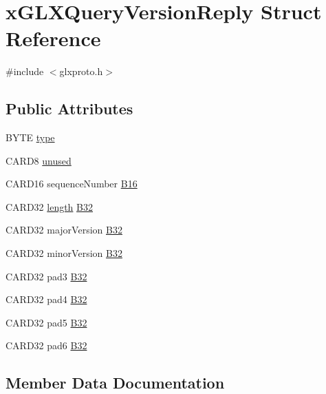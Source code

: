 \hypertarget{structx_g_l_x_query_version_reply}{}\section{x\+G\+L\+X\+Query\+Version\+Reply Struct Reference}
\label{structx_g_l_x_query_version_reply}


{\ttfamily \#include $<$glxproto.\+h$>$}

\subsection*{Public Attributes}
\begin{DoxyCompactItemize}
\item 
B\+Y\+TE \hyperlink{structx_g_l_x_query_version_reply_ae3ead0f46874a7a0d2632157b418acbb}{type}
\item 
C\+A\+R\+D8 \hyperlink{structx_g_l_x_query_version_reply_aec85cfd7fd03acfb9bdf8f8741904b13}{unused}
\item 
C\+A\+R\+D16 sequence\+Number \hyperlink{structx_g_l_x_query_version_reply_acb11db1bc7971911c7094f2874bb8a72}{B16}
\item 
C\+A\+R\+D32 \hyperlink{glcorearb_8h_ab9c919755bde3b34349e23a32b4e0fa7}{length} \hyperlink{structx_g_l_x_query_version_reply_a39a6dd443f8d17d5ca0adab45c351231}{B32}
\item 
C\+A\+R\+D32 major\+Version \hyperlink{structx_g_l_x_query_version_reply_ab6feee7c675beb52b9d4a708a05a6c0d}{B32}
\item 
C\+A\+R\+D32 minor\+Version \hyperlink{structx_g_l_x_query_version_reply_af38ece972a979eb32748943566557da7}{B32}
\item 
C\+A\+R\+D32 pad3 \hyperlink{structx_g_l_x_query_version_reply_ae3d9e16e724f002e04c20b05a9d05416}{B32}
\item 
C\+A\+R\+D32 pad4 \hyperlink{structx_g_l_x_query_version_reply_a3864529b116230a2a9a8f27e724d5c48}{B32}
\item 
C\+A\+R\+D32 pad5 \hyperlink{structx_g_l_x_query_version_reply_a0cdfeb8166dd1f03227c3910722faabc}{B32}
\item 
C\+A\+R\+D32 pad6 \hyperlink{structx_g_l_x_query_version_reply_a1252ea5efd5966c38149a6a051e0830f}{B32}
\end{DoxyCompactItemize}


\subsection{Member Data Documentation}
\mbox{\label{structx_g_l_x_query_version_reply_acb11db1bc7971911c7094f2874bb8a72}} 
